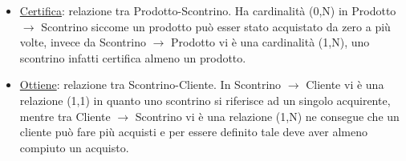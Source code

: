 \begin{itemize}
\item \underline{Certifica}: relazione tra Prodotto-Scontrino. Ha cardinalit\`a (0,N) in Prodotto $\to$ Scontrino siccome un prodotto pu\`o esser stato acquistato da zero a pi\`u volte, invece da Scontrino $\to$ Prodotto vi \`e una cardinalit\`a (1,N), uno scontrino infatti certifica almeno un prodotto.

\item \underline{Ottiene}: relazione tra Scontrino-Cliente. In Scontrino $\to$ Cliente vi \`e una relazione (1,1) in quanto uno scontrino si riferisce ad un singolo acquirente, mentre tra Cliente $\to$ Scontrino vi \`e una relazione (1,N) ne consegue che un cliente pu\`o fare pi\`u acquisti e per essere definito tale deve aver almeno compiuto un acquisto.
  
\end{itemize}
